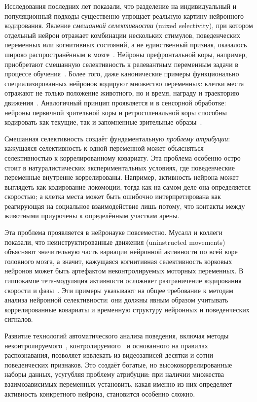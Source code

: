 Исследования последних лет показали, что разделение на индивидуальный и популяционный подходы существенно упрощает реальную картину нейронного кодирования. Явление \textit{смешанной селективности} (mixed selectivity), при котором отдельный нейрон отражает комбинации нескольких стимулов, поведенческих переменных или когнитивных состояний, а не единственный признак, оказалось широко распространённым в мозге~\cite{TyeMiller2024}. Нейроны префронтальной коры, например, приобретают смешанную селективность к релевантным переменным задачи в процессе обучения~\cite{mix3, Mante2013}. Более того, даже канонические примеры функционально специализированных нейронов кодируют множество переменных: клетки места отражают не только положение животного, но и время, награду и траекторию движения~\cite{Zheng2021, Lian2022}. Аналогичный принцип проявляется и в сенсорной обработке: нейроны первичной зрительной коры и ретроспленальной коры способны кодировать как текущие, так и запомненные зрительные образы~\cite{Makino2015}.

Смешанная селективность создаёт фундаментальную \textit{проблему атрибуции}: кажущаяся селективность к одной переменной может объясняться селективностью к коррелированному ковариату. Эта проблема особенно остро стоит в натуралистических экспериментальных условиях, где поведенческие переменные внутренне коррелированы. Например, активность нейрона может выглядеть как кодирование локомоции, тогда как на самом деле она определяется скоростью; а клетка места может быть ошибочно интерпретирована как реагирующая на социальное взаимодействие лишь потому, что контакты между животными приурочены к определённым участкам арены.

Эта проблема проявляется в нейронауке повсеместно. Мусалл и коллеги~\cite{Musall2019} показали, что неинструктированные движения (uninstructed movements) объясняют значительную часть вариации нейронной активности по всей коре головного мозга, а значит, кажущаяся когнитивная селективность корковых нейронов может быть артефактом неконтролируемых моторных переменных. В гиппокампе тета-модуляция активности осложняет разграничение кодирования скорости и фазы~\cite{Vanderwolf1969, McNaughton1983}. Эти примеры указывают на общее требование к методам анализа нейронной селективности: они должны явным образом учитывать коррелированные ковариаты и временную структуру нейронных и поведенческих сигналов.

Развитие технологий автоматического анализа поведения, включая методы неконтролируемого~\cite{Weinreb2024}, контролируемого~\cite{Harris2023deepaction, Segalin2021} и основанного на правилах~\cite{Gabriel2022} распознавания, позволяет извлекать из видеозаписей десятки и сотни поведенческих признаков. Это создаёт богатые, но высококоррелированные наборы данных, усугубляя проблему атрибуции: при наличии множества взаимозависимых переменных установить, какая именно из них определяет активность конкретного нейрона, становится особенно сложно.

